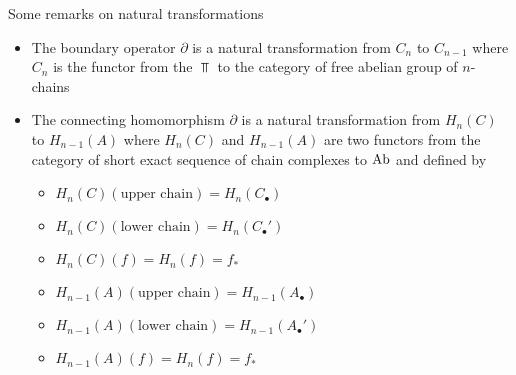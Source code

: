 \documentclass{report}
\begin{document}
\begin{remark}
    Some remarks on natural transformations
    \begin{itemize}
        \item The boundary operator $\partial$ is a natural transformation from $C_n$ to $C_{n-1}$ where $C_n$ is the functor from the $\Top$ to the category of free abelian group of $n$-chains
        \begin{center}
        \end{center}
    
        \item The connecting homomorphism $\partial$ is a natural transformation from $H_n(C)$ to $H_{n-1}(A)$ where $H_n(C)$ and $H_{n-1}(A)$ are two functors from the category of short exact sequence of chain complexes to $\operatorname{Ab}$ and defined by
        \begin{itemize}
            \item $H_n(C)(\text{upper chain}) = H_n(C_\bullet)$
            \item $H_n(C)(\text{lower chain}) = H_n(C_\bullet')$
            \item $H_n(C)(f) = H_n(f) = f_*$
            \item $H_{n-1}(A)(\text{upper chain}) = H_{n-1}(A_\bullet)$
            \item $H_{n-1}(A)(\text{lower chain}) = H_{n-1}(A_\bullet')$
            \item $H_{n-1}(A)(f) = H_n(f) = f_*$
        \end{itemize}
        \begin{center}
        \end{center}
    \end{itemize}
\end{remark}
\end{document}

